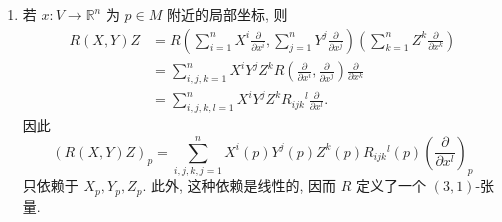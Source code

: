\begin{description}[font=\normalfont,leftmargin=2em,labelwidth=1.5em]
\begin{enumerate}[label=(\alph*),ref=\alph*,leftmargin=*]
\begin{enumerate}[label=(\roman*),ref=\roman*,leftmargin=*]
\begin{align*}
  &=f\nabla_X\nabla_YZ+(X\cdot f)\nabla_YZ+(Y\cdot f)\nabla_XZ\\
  &\quad+(X\cdot(Y\cdot f))Z-f\nabla_Y\nabla_XZ-(Y\cdot f)\nabla_XZ\\
  &\quad-(X\cdot f)\nabla_YZ-(Y\cdot(X\cdot f))Z-f\nabla_{[X,Y]}Z\\
  &\quad-([X,Y]\cdot f)Z\\
  &=f(\nabla_X\nabla_YZ-\nabla_Y\nabla_XZ-\nabla_{[X,Y]}Z)\\
  &\quad+(X\cdot(Y\cdot f)-Y\cdot(X\cdot f))Z-([X,Y]\cdot f)Z\\
  &=fR(X,Y)Z.
\end{align*}
\end{enumerate}
\item 若 $x:V\to\mathbb{R}^n$ 为 $p\in M$ 附近的局部坐标, 则
\begin{align*}
  R(X,Y)Z
  &=R\left(\sum_{i=1}^nX^i\frac{\partial}{\partial x^i},
            \sum_{j=1}^nY^j\frac{\partial}{\partial x^j}\right)
     \left(\sum_{k=1}^nZ^k\frac{\partial}{\partial x^k}\right)\\
  &=\sum_{i,j,k=1}^nX^iY^jZ^kR\left(\frac{\partial}{\partial x^i},\frac{\partial}{\partial x^j}\right)
       \frac{\partial}{\partial x^k}\\
  &=\sum_{i,j,k,l=1}^n X^iY^jZ^kR_{ijk}{}^l\frac{\partial}{\partial x^l}.
\end{align*}
因此
\[
  (R(X,Y)Z)_p=\sum_{i,j,k,j=1}^nX^i(p)Y^j(p)Z^k(p)R_{ijk}{}^l(p)
   \left(\frac{\partial}{\partial x^l}\right)_p
\]
只依赖于 $X_p,Y_p,Z_p$. 此外, 这种依赖是线性的, 因而 $R$ 定义了一个 $(3,1)$-张量.
\end{enumerate}


\end{description}
